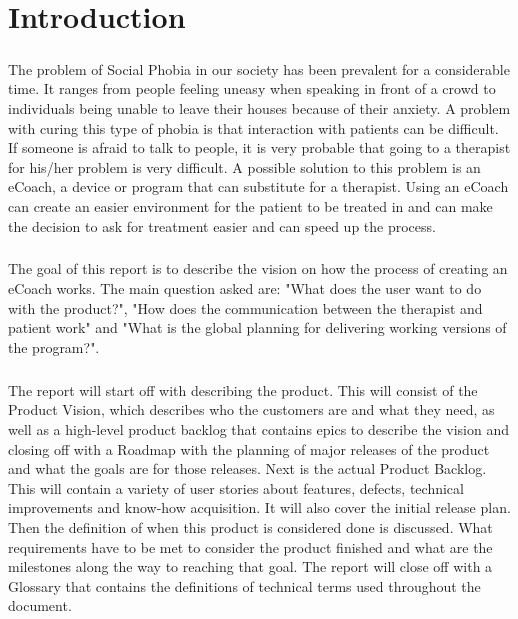 \chapter{Introduction}

\paragraph{}
The problem of Social Phobia in our society has been prevalent for a considerable time. It ranges from people feeling uneasy when speaking in front of a crowd to individuals being unable to leave their houses because of their anxiety. 
A problem with curing this type of phobia is that interaction with patients can be difficult. If someone is afraid to talk to people, it is very probable that going to a therapist for his/her problem is very difficult. A possible solution to this problem is an \gls{eCoach}, a device or program that can substitute for a therapist. Using an \gls{eCoach} can create an easier environment for the patient to be treated in and can make the decision to ask for treatment easier and can speed up the process.
\paragraph{}
The goal of this report is to describe the vision on how the process of creating an \gls{eCoach} works. The main question asked are: "What does the user want to do with the product?", "How does the communication between the therapist and patient work" and "What is the global planning for delivering working versions of the program?".
\paragraph{}
The report will start off with describing the product. This will consist of the Product Vision, which describes who the customers are and what they need, as well as a high-level product backlog that contains epics to describe the vision and closing off with a Roadmap with the planning of major releases of the product and what the goals are for those releases.
Next is the actual Product Backlog. This will contain a variety of user stories about features, defects, technical improvements and know-how acquisition. It will also cover the initial release plan.
Then the definition of when this product is considered done is discussed. What requirements have to be met to consider the product finished and what are the milestones along the way to reaching that goal.
The report will close off with a Glossary that contains the definitions of technical terms used throughout the document.